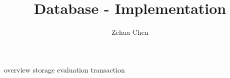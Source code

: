 \documentclass{../../../shared/latex/notes}
\title{Database - Implementation}
\author{Zehua Chen}
\begin{document}
  \maketitle
  \tableofcontents

  {overview}
  {storage}
  {evaluation}
  {transaction}
\end{document}
